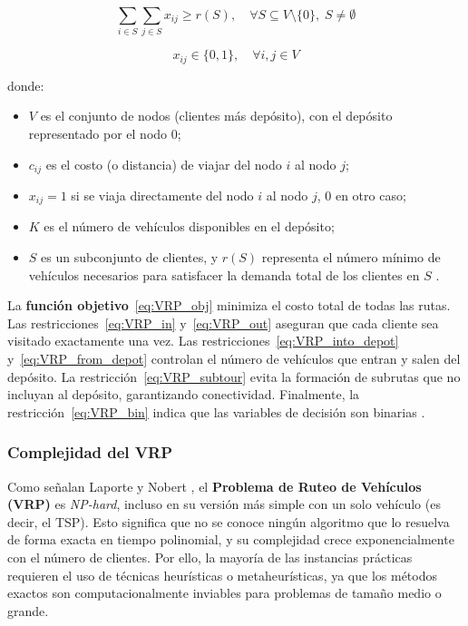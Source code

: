 \documentclass[12pt,titlepage,twoside,openright]{book}
\begin{document}
\begin{equation}
	\sum_{i \in S} \sum_{j \in S} x_{ij} \geq r(S), \quad \forall S \subseteq V \setminus \{0\},\; S \neq \emptyset
	\label{eq:VRP_subtour}
\end{equation}

\begin{equation}
	x_{ij} \in \{0, 1\}, \quad \forall i,j \in V
	\label{eq:VRP_bin}
\end{equation}
\medskip

\noindent donde:
\begin{itemize}
	\item \(V\) es el conjunto de nodos (clientes más depósito), con el depósito representado por el nodo 0;
	\item \(c_{ij}\) es el costo (o distancia) de viajar del nodo \(i\) al nodo \(j\);
	\item \(x_{ij} = 1\) si se viaja directamente del nodo \(i\) al nodo \(j\), 0 en otro caso;
	\item \(K\) es el número de vehículos disponibles en el depósito;
	\item \(S\) es un subconjunto de clientes, y \(r(S)\) representa el número mínimo de vehículos necesarios para satisfacer la demanda total de los clientes en \(S\) \citep{toth2014}.
\end{itemize}

La \textbf{función objetivo}~\eqref{eq:VRP_obj} minimiza el costo total de todas las rutas. Las restricciones~\eqref{eq:VRP_in} y~\eqref{eq:VRP_out} aseguran que cada cliente sea visitado exactamente una vez. Las restricciones~\eqref{eq:VRP_into_depot} y~\eqref{eq:VRP_from_depot} controlan el número de vehículos que entran y salen del depósito. La restricción~\eqref{eq:VRP_subtour} evita la formación de subrutas que no incluyan al depósito, garantizando conectividad. Finalmente, la restricción~\eqref{eq:VRP_bin} indica que las variables de decisión son binarias \citep{toth2014}.


\subsubsection*{Complejidad del VRP}
\label{subsec:complejidad_vrp}

Como señalan Laporte y Nobert \cite{laporte1987}, el \textbf{Problema de Ruteo de Vehículos (VRP)} es \textit{NP-hard}, incluso en su versión más simple con un solo vehículo (es decir, el TSP). Esto significa que no se conoce ningún algoritmo que lo resuelva de forma exacta en tiempo polinomial, y su complejidad crece exponencialmente con el número de clientes. Por ello, la mayoría de las instancias prácticas requieren el uso de técnicas heurísticas o metaheurísticas, ya que los métodos exactos son computacionalmente inviables para problemas de tamaño medio o grande.
\end{document}
